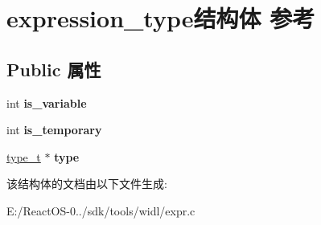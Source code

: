 \hypertarget{structexpression__type}{}\section{expression\+\_\+type结构体 参考}
\label{structexpression__type}
\subsection*{Public 属性}
\begin{DoxyCompactItemize}
\item 
\mbox{\label{structexpression__type_ac6bfbba9b3642b1563b80ba14e0555af}} 
int {\bfseries is\+\_\+variable}
\item 
\mbox{\label{structexpression__type_a28ba11233ae379431089c5900dfa3350}} 
int {\bfseries is\+\_\+temporary}
\item 
\mbox{\label{structexpression__type_a0e9d7f9def20579fe3d0bc30320cff29}} 
\hyperlink{struct__type__t}{type\+\_\+t} $\ast$ {\bfseries type}
\end{DoxyCompactItemize}


该结构体的文档由以下文件生成\+:\begin{DoxyCompactItemize}
\item 
E\+:/\+React\+O\+S-\/0../sdk/tools/widl/expr.\+c\end{DoxyCompactItemize}
